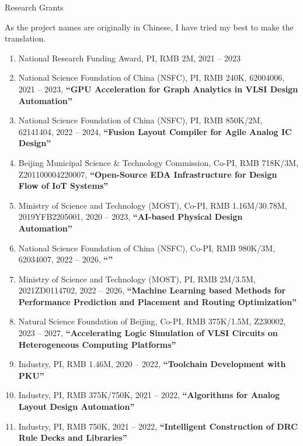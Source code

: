 \begin{rSection}{Research Grants}

As the project names are originally in Chinese, I have tried my best to make the translation. 

\begin{enumerate}[font=\normalfont]

\item National Research Funding Award, PI, RMB 2M, 2021 -- 2023

\item National Science Foundation of China (NSFC), PI, RMB 240K, 62004006, 2021 -- 2023, \textbf{``GPU Acceleration for Graph Analytics in VLSI Design Automation''}

\item National Science Foundation of China (NSFC), PI, RMB 850K/2M, 62141404, 2022 -- 2024, \textbf{``Fusion Layout Compiler for Agile Analog IC Design''}

\item Beijing Municipal Science \& Technology Commission, Co-PI, RMB 718K/3M, Z201100004220007, \textbf{``Open-Source EDA Infrastructure for Design Flow of IoT Systems''}

\item Ministry of Science and Technology (MOST), Co-PI, RMB 1.16M/30.78M, 2019YFB2205001, 2020 -- 2023, \textbf{``AI-based Physical Design Automation''}

\item National Science Foundation of China (NSFC), Co-PI, RMB 980K/3M, 62034007, 2022 -- 2026, \textbf{``''}

\item Ministry of Science and Technology (MOST), PI, RMB 2M/3.5M, 2021ZD0114702, 2022 -- 2026, \textbf{``Machine Learning based Methods for Performance Prediction and Placement and Routing Optimization''}

\item Natural Science Foundation of Beijing, Co-PI, RMB 375K/1.5M, Z230002, 2023 -- 2027, \textbf{``Accelerating Logic Simulation of VLSI Circuits on Heterogeneous Computing Platforms''}

\item Industry, PI, RMB 1.46M, 2020 -- 2022, \textbf{``Toolchain Development with PKU''}

\item Industry, PI, RMB 375K/750K, 2021 -- 2022, \textbf{``Algorithms for Analog Layout Design Automation''}

\item Industry, PI, RMB 750K, 2021 -- 2022, \textbf{``Intelligent Construction of DRC Rule Decks and Libraries''}


\end{enumerate}
\end{rSection}
